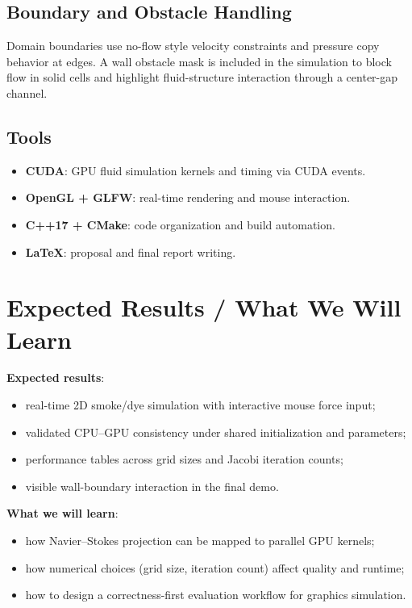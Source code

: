 \documentclass[10pt,a4paper]{article}
\begin{document}
\subsection{Boundary and Obstacle Handling}
Domain boundaries use no-flow style velocity constraints and pressure copy behavior at edges. A wall obstacle mask is included in the simulation to block flow in solid cells and highlight fluid-structure interaction through a center-gap channel.

\subsection{Tools}
\begin{itemize}
    \item \textbf{CUDA}: GPU fluid simulation kernels and timing via CUDA events.
    \item \textbf{OpenGL + GLFW}: real-time rendering and mouse interaction.
    \item \textbf{C++17 + CMake}: code organization and build automation.
    \item \textbf{LaTeX}: proposal and final report writing.
\end{itemize}

\section{Expected Results / What We Will Learn}
\textbf{Expected results}:
\begin{itemize}
    \item real-time 2D smoke/dye simulation with interactive mouse force input;
    \item validated CPU--GPU consistency under shared initialization and parameters;
    \item performance tables across grid sizes and Jacobi iteration counts;
    \item visible wall-boundary interaction in the final demo.
\end{itemize}

\textbf{What we will learn}:
\begin{itemize}
    \item how Navier--Stokes projection can be mapped to parallel GPU kernels;
    \item how numerical choices (grid size, iteration count) affect quality and runtime;
    \item how to design a correctness-first evaluation workflow for graphics simulation.
\end{itemize}
\end{document}
